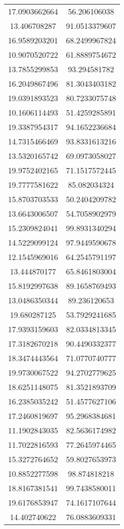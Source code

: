 \begin{table}
\begin{tabular}{cc}
17.0903662664 & 56.206106038 \\
13.406708287 & 91.0513379607 \\
16.9589203201 & 68.2499967824 \\
10.9070520722 & 61.8889754672 \\
13.7855299853 & 93.294581782 \\
16.2049867496 & 81.3043403182 \\
19.0391893523 & 80.7233075748 \\
10.1606114493 & 51.4259285891 \\
19.3387954317 & 94.1652236684 \\
14.7315466469 & 93.8331613216 \\
13.5320165742 & 69.0973058027 \\
19.9752402165 & 71.1517572445 \\
19.7777581622 & 85.082034324 \\
15.8703703533 & 50.2404209782 \\
13.6643006507 & 54.7058902979 \\
15.2309824041 & 99.8931340294 \\
14.5229099124 & 97.9449590678 \\
12.1545969016 & 64.2545791197 \\
13.444870177 & 65.8461803004 \\
15.8192997638 & 89.1658769493 \\
13.0486350344 & 89.236120653 \\
19.680287125 & 53.7929241685 \\
17.9393159603 & 82.0334813345 \\
17.3182670218 & 90.4490332377 \\
18.3474443564 & 71.0770740777 \\
19.9730067522 & 94.2702779625 \\
18.6251148075 & 81.3521893709 \\
16.2385035242 & 51.4577627106 \\
17.2460819697 & 95.2968384681 \\
11.1902843035 & 82.5636174982 \\
11.7022816593 & 77.2645974465 \\
15.3272764652 & 59.8027653973 \\
10.8852277598 & 98.874818218 \\
18.8167381541 & 99.7438580011 \\
19.6176853947 & 74.1617107644 \\
14.402740622 & 76.0883609331 \\

\end{tabular}
\end{table}
